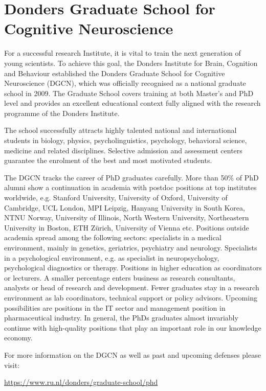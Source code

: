 
\section{Donders Graduate School for Cognitive Neuroscience}

For a successful research Institute, it is vital to train the next generation of young scientists. To achieve this goal, the Donders Institute for Brain, Cognition and Behaviour established the Donders Graduate School for Cognitive Neuroscience (DGCN), which was officially recognised as a national graduate school in 2009. The Graduate School covers training at both Master's and PhD level and provides an excellent educational context fully aligned with the research programme of the Donders Institute.

The school successfully attracts highly talented national and international students in biology, physics, psycholinguistics, psychology, behavioral science, medicine and related disciplines. Selective admission and assessment centers guarantee the enrolment of the best and most motivated students.

The DGCN tracks the career of PhD graduates carefully. More than 50\% of PhD alumni show a continuation in academia with postdoc positions at top institutes worldwide, e.g. Stanford University, University of Oxford, University of Cambridge, UCL London, MPI Leipzig, Hanyang University in South Korea, NTNU Norway, University of Illinois, North Western University, Northeastern University in Boston, ETH Z\"urich, University of Vienna etc. Positions outside academia spread among the following sectors: specialists in a medical environment, mainly in genetics, geriatrics, psychiatry and neurology. Specialists in a psychological environment, e.g. as specialist in neuropsychology, psychological diagnostics or therapy. Positions in higher education as coordinators or lecturers. A smaller percentage enters business as research consultants, analysts or head of research and development. Fewer graduates stay in a research environment as lab coordinators, technical support or policy advisors. Upcoming possibilities are positions in the IT sector and management position in pharmaceutical industry. In general, the PhDs graduates almost invariably continue with high-quality positions that play an important role in our knowledge economy.

For more information on the DGCN as well as past and upcoming defenses please visit: 

\url{https://www.ru.nl/donders/graduate-school/phd}

